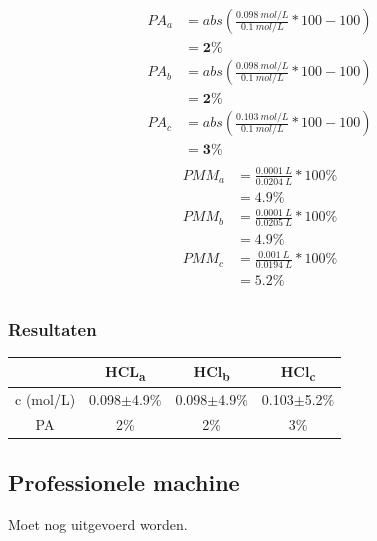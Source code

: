 \documentclass[11pt]{report}
\begin{document}
\begin{multicols}{2}
    \begin{equation*}
        \begin{split}
            PA_a &= abs(\frac{0.098\ mol/L}{0.1\ mol/L}*100-100)\\
                &= \mathbf{2\%} \\
            PA_b &= abs(\frac{0.098\ mol/L}{0.1\ mol/L}*100-100)\\
                &= \mathbf{2\%} \\
            PA_c &= abs(\frac{0.103\ mol/L}{0.1\ mol/L}*100-100)\\
                &= \mathbf{3\%} \\
        \end{split}
    \end{equation*}
\break
    \begin{equation*}
        \begin{split}
            PMM_a &= \frac{0.0001\ L}{0.0204\ L}*100\%\\
                &= \mathbf{4.9\%}\\
            PMM_b &= \frac{0.0001\ L}{0.0205\ L}*100\%\\
                &= \mathbf{4.9\%}\\
            PMM_c &= \frac{0.001\ L}{0.0194\ L}*100\%\\
                &= \mathbf{5.2\%}\\
        \end{split}
    \end{equation*}
\end{multicols}

\subsubsection{Resultaten}
\begin{tabular}{|c|c|c|c|}
    \hline
    & HCL\textsubscript{a} & HCl\textsubscript{b} & HCl\textsubscript{c} \\\hline
    c (mol/L) & 0.098$\pm$4.9\% & 0.098$\pm$4.9\% & 0.103$\pm$5.2\% \\\hline
    PA  & 2\% & 2\% & 3\% \\\hline
\end{tabular}

\newpage

\subsection{Professionele machine}
Moet nog uitgevoerd worden.
\end{document}
